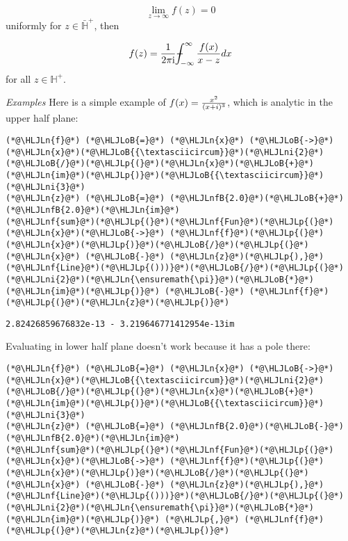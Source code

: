 \documentclass[12pt,a4paper]{article}
\newcommand{\HLJLn}[1]{#1}
\newcommand{\HLJLnf}[1]{\textcolor[RGB]{66,102,213}{#1}}
\newcommand{\HLJLnfB}[1]{\textcolor[RGB]{59,151,46}{#1}}
\newcommand{\HLJLni}[1]{\textcolor[RGB]{59,151,46}{#1}}
\newcommand{\HLJLoB}[1]{\textcolor[RGB]{102,102,102}{\textbf{#1}}}
\newcommand{\HLJLp}[1]{#1}
\def\I{ {\rm i} }
\def\Xint#1{ \mathchoice
   {\XXint\displaystyle\textstyle{#1} }%
   {\XXint\textstyle\scriptstyle{#1} }%
   {\XXint\scriptstyle\scriptscriptstyle{#1} }%
   {\XXint\scriptscriptstyle\scriptscriptstyle{#1} }%
   \!\int}
\def\XXint#1#2#3{ {\setbox0=\hbox{$#1{#2#3}{\int}$}
     \vcenter{\hbox{$#2#3$}}\kern-.5\wd0} }
\def\dashint{\Xint-}
\def\infdashint{\dashint_{-\infty}^\infty}
\begin{document}
\[
\lim_{z \rightarrow \infty} f(z) = 0
\]
uniformly for $z \in \bar {\mathbb H}^+$, then

\[
f(z) = {1 \over 2 \pi \I} \infdashint {f(x) \over x - z} dx
\]
for all  $z \in {\mathbb H}^+$.

\emph{Examples} Here is a simple example of $f(x) = {x^2 \over (x+ i)^3}$, which is analytic in the upper half plane:


\begin{lstlisting}
(*@\HLJLn{f}@*) (*@\HLJLoB{=}@*) (*@\HLJLn{x}@*) (*@\HLJLoB{->}@*) (*@\HLJLn{x}@*)(*@\HLJLoB{{\textasciicircum}}@*)(*@\HLJLni{2}@*)(*@\HLJLoB{/}@*)(*@\HLJLp{(}@*)(*@\HLJLn{x}@*)(*@\HLJLoB{+}@*)(*@\HLJLn{im}@*)(*@\HLJLp{)}@*)(*@\HLJLoB{{\textasciicircum}}@*)(*@\HLJLni{3}@*)
(*@\HLJLn{z}@*) (*@\HLJLoB{=}@*) (*@\HLJLnfB{2.0}@*)(*@\HLJLoB{+}@*)(*@\HLJLnfB{2.0}@*)(*@\HLJLn{im}@*)
(*@\HLJLnf{sum}@*)(*@\HLJLp{(}@*)(*@\HLJLnf{Fun}@*)(*@\HLJLp{(}@*)(*@\HLJLn{x}@*)(*@\HLJLoB{->}@*) (*@\HLJLnf{f}@*)(*@\HLJLp{(}@*)(*@\HLJLn{x}@*)(*@\HLJLp{)}@*)(*@\HLJLoB{/}@*)(*@\HLJLp{(}@*)(*@\HLJLn{x}@*) (*@\HLJLoB{-}@*) (*@\HLJLn{z}@*)(*@\HLJLp{),}@*) (*@\HLJLnf{Line}@*)(*@\HLJLp{()))}@*)(*@\HLJLoB{/}@*)(*@\HLJLp{(}@*)(*@\HLJLni{2}@*)(*@\HLJLn{\ensuremath{\pi}}@*)(*@\HLJLoB{*}@*)(*@\HLJLn{im}@*)(*@\HLJLp{)}@*) (*@\HLJLoB{-}@*) (*@\HLJLnf{f}@*)(*@\HLJLp{(}@*)(*@\HLJLn{z}@*)(*@\HLJLp{)}@*)
\end{lstlisting}

\begin{lstlisting}
2.82426859676832e-13 - 3.219646771412954e-13im
\end{lstlisting}


Evaluating in lower half plane doesn't work because it has a pole there:


\begin{lstlisting}
(*@\HLJLn{f}@*) (*@\HLJLoB{=}@*) (*@\HLJLn{x}@*) (*@\HLJLoB{->}@*) (*@\HLJLn{x}@*)(*@\HLJLoB{{\textasciicircum}}@*)(*@\HLJLni{2}@*)(*@\HLJLoB{/}@*)(*@\HLJLp{(}@*)(*@\HLJLn{x}@*)(*@\HLJLoB{+}@*)(*@\HLJLn{im}@*)(*@\HLJLp{)}@*)(*@\HLJLoB{{\textasciicircum}}@*)(*@\HLJLni{3}@*)
(*@\HLJLn{z}@*) (*@\HLJLoB{=}@*) (*@\HLJLnfB{2.0}@*)(*@\HLJLoB{-}@*)(*@\HLJLnfB{2.0}@*)(*@\HLJLn{im}@*)
(*@\HLJLnf{sum}@*)(*@\HLJLp{(}@*)(*@\HLJLnf{Fun}@*)(*@\HLJLp{(}@*)(*@\HLJLn{x}@*)(*@\HLJLoB{->}@*) (*@\HLJLnf{f}@*)(*@\HLJLp{(}@*)(*@\HLJLn{x}@*)(*@\HLJLp{)}@*)(*@\HLJLoB{/}@*)(*@\HLJLp{(}@*)(*@\HLJLn{x}@*) (*@\HLJLoB{-}@*) (*@\HLJLn{z}@*)(*@\HLJLp{),}@*) (*@\HLJLnf{Line}@*)(*@\HLJLp{()))}@*)(*@\HLJLoB{/}@*)(*@\HLJLp{(}@*)(*@\HLJLni{2}@*)(*@\HLJLn{\ensuremath{\pi}}@*)(*@\HLJLoB{*}@*)(*@\HLJLn{im}@*)(*@\HLJLp{)}@*) (*@\HLJLp{,}@*) (*@\HLJLnf{f}@*)(*@\HLJLp{(}@*)(*@\HLJLn{z}@*)(*@\HLJLp{)}@*)
\end{lstlisting}
\end{document}
